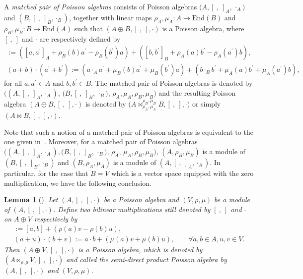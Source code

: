 \documentclass[10pt,a4paper]{amsart}
\numberwithin{equation}{section}
\newtheorem{Lemma}[Theorem]{Lemma}
\newcommand{\End}{\mathrm{End}}
\begin{document}
\begin{Definition}\label{def:matpoi}
 A \textit{matched pair of Poisson algebras} consists of Poisson algebras $(A, [\ ,\ ]_A$, $\cdot_A)$ and $(B, [\ ,\ ]_B,\cdot_B)$, together with linear maps $\rho_A, \mu_A\colon A \to \End(B)$ and $\rho_B, \mu_B\colon B \to \End(A)$ such that $(A \oplus B, [\ ,\ ], \cdot)$ is a Poisson algebra, where $[\ ,\ ]$ and $\cdot$ are respectively defined by
 \begin{gather*}
 	[a + b, a^\prime + b^\prime] := ([a, a^\prime]_A + \rho_B(b)a^\prime - \rho_B(b^\prime) a ) + ([b, b^\prime]_B + \rho_A(a)b^\prime - \rho_A(a^\prime)b ), \\
 	(a + b) \cdot (a^\prime + b^\prime) := (a \cdot_A a^\prime + \mu_B(b)a^\prime + \mu_B(b^\prime)a) + (b \cdot_B b^\prime + \mu_A(a) b^\prime + \mu_A(a^\prime)b ),
 \end{gather*}
 for all $a,a^\prime\in A$ and $b,b^\prime\in B$.
 The matched pair of Poisson algebras is denoted by $((A, [\ ,\ ]_A, \cdot_A)$, $(B, [\ ,\ ]_B$, $\cdot_B)$, $\rho_A, \mu_A, \rho_B, \mu_B)$ and the resulting Poisson algebra $(A \oplus B, [\ ,\ ], \cdot)$ is denoted by $\big(A \bowtie_{\rho_A, \mu_A}^{\rho_B, \mu_B} B, [\ ,\ ], \cdot\big)$ or simply $(A \bowtie B, [\ ,\ ], \cdot)$.
\end{Definition}

Note that such a notion of a matched pair of Poisson algebras is equivalent to the one given in~\cite[Theorem 1]{ni2013poisson}.
Moreover, for a matched pair of Poisson algebras $((A, [\ ,\ ]_A, \cdot_A), (B, [\ ,\ ]_B$, $\cdot_B)$, $\rho_A$, $\mu_A, \rho_B, \mu_B)$, $(A,\rho_B,\mu_B)$ is a module of
$(B, [\ ,\ ]_B, \cdot_B)$ and $(B,\rho_A,\mu_A)$ is a module of $(A, [\ ,\ ]_A, \cdot_A)$. In particular, for the case that $B=V$ which is a vector
space equipped with the zero multiplication, we have the following conclusion.

\begin{Lemma}[\cite{ni2013poisson}]
 Let $(A, [\ ,\ ], \cdot)$ be a Poisson algebra and $(V, \rho,\mu)$ be a module of $(A, [\ ,\ ],
 \cdot)$.
 Define two bilinear multiplications still denoted by $[\ ,\ ]$ and
 $\cdot$ on $A\oplus V$ respectively by
	\begin{gather*}
 [(a+u), (b+v)] := [a,b] + (\rho(a)v - \rho(b)u),\\
 (a+u) \cdot (b+v) := a \cdot b + (\mu(a)v + \mu(b)u), \qquad
 \forall a, b \in A, u,v \in V.
 \end{gather*}
 Then $(A \oplus V, [\ ,\ ], \cdot)$ is a Poisson algebra, which is denoted by $(A \ltimes_{\rho, \mu} V, [\ ,\ ], \cdot)$ and called the \textit{semi-direct product Poisson algebra} by $(A, [\ ,\ ], \cdot)$ and $(V, \rho, \mu)$.
\end{Lemma}
\end{document}
